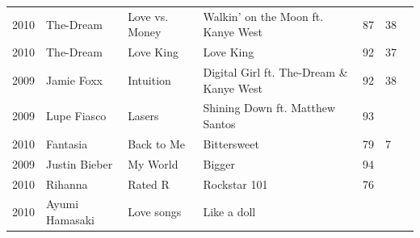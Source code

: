 \documentclass{article}
\begin{document}
\begin{tabular}{lllllll}
2010 & The-Dream & Love vs. Money & Walkin' on the Moon ft. Kanye West & 87 & 38 &  \\
2010 & The-Dream & Love King & Love King & 92 & 37 &  \\
2009 & Jamie Foxx & Intuition & Digital Girl ft. The-Dream \& Kanye West & 92 & 38 &  \\
2009 & Lupe Fiasco & Lasers & Shining Down ft. Matthew Santos & 93 &  &  \\
2010 & Fantasia & Back to Me & Bittersweet & 79 & 7 &  \\
2009 & Justin Bieber & My World & Bigger & 94 &  &  \\
2010 & Rihanna & Rated R & Rockstar 101 & 76 &  &  \\
2010 & Ayumi Hamasaki & Love songs & Like a doll &  &  &  \\
\bottomrule
\end{tabular}
\end{document}
